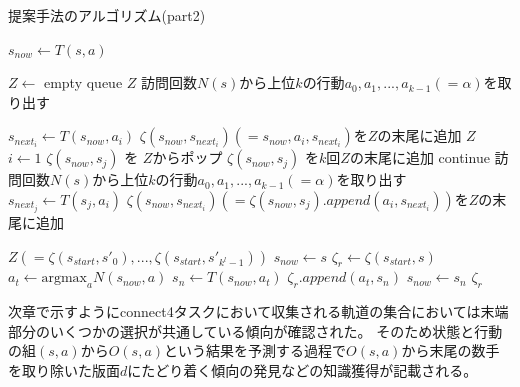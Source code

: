 \begin{algorithm}
    \caption{提案手法のアルゴリズム(part2)}
    \begin{algorithmic}[1]       
           \State $s_{now} \gets T(s, a)$
           
           \State $Z \gets $ empty queue
             \Return  $Z$
            \EndIf
           \State 訪問回数$N(s)$から上位$k$の行動${a_0, a_1, ..., a_{k-1}}(=\alpha)$を取り出す
             
             \State $s_{{next}_i} \gets T(s_{now}, a_i)$
             \State $\zeta(s_{now},s_{{next}_i})(={s_{now}, a_i, s_{{next}_i}})$を$Z$の末尾に追加
           \EndFor
             \Return $Z$
           \EndIf
           \State $i \gets 1$
                    \State $\zeta(s_{now}, s_{j})$ を $Z$からポップ
                        \State $\zeta(s_{now}, s_{j})$ を$k$回$Z$の末尾に追加
                        \State continue
                    \EndIf
                    \State 訪問回数$N(s)$から上位$k$の行動${a_0, a_1, ..., a_{k-1}}(=\alpha)$を取り出す
                        \State $s_{{next}_j} \gets T(s_{j}, a_i)$
                        \State $\zeta(s_{now},s_{{next}_i})(=\zeta(s_{now}, s_{j}).append({a_i, s_{{next}_i}}))$を$Z$の末尾に追加
                    \EndFor
                    
                \EndFor     
           \EndWhile
           \Return $Z(={\zeta(s_{start}, {s'}_0), ..., \zeta(s_{start}, {s'}_{k^l-1})})$
        \EndFunction
        \State $s_{now} \gets s$
        \State $\zeta_r \gets \zeta(s_{start}, s)$
            \State $a_t \gets \textrm{argmax}_a N(s_{now}, a)$
            \State $s_n \gets T(s_{now}, a_t)$
            \State $\zeta_r.append({a_t, s_n})$
            \State $s_{now} \gets s_n$
        \EndWhile
        \Return $\zeta_r$
        \EndFunction
       
        
    \end{algorithmic}
\end{algorithm}


次章で示すようにconnect4タスクにおいて収集される軌道の集合においては末端部分のいくつかの選択が共通している傾向が確認された。
そのため状態と行動の組$(s, a)$から$O(s, a)$という結果を予測する過程で$O(s, a)$から末尾の数手を取り除いた版面$d$にたどり着く傾向の発見などの知識獲得が記載される。
